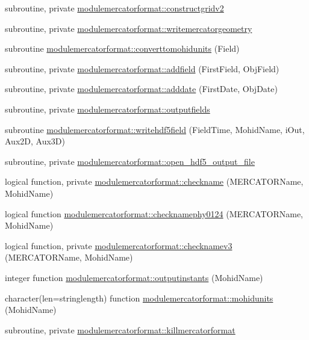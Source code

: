 \begin{DoxyCompactItemize}
subroutine, private \mbox{\hyperlink{namespacemodulemercatorformat_ab1d75b183b32a1b3d634bf12fcf66303}{modulemercatorformat\+::constructgridv2}}
\item 
subroutine, private \mbox{\hyperlink{namespacemodulemercatorformat_a91963802a12780a4b2d6d09497ba91ac}{modulemercatorformat\+::writemercatorgeometry}}
\item 
subroutine \mbox{\hyperlink{namespacemodulemercatorformat_afe587bb63f0975739ea6aae4c3ce6a6f}{modulemercatorformat\+::converttomohidunits}} (Field)
\item 
subroutine, private \mbox{\hyperlink{namespacemodulemercatorformat_ad07eac9a69191b73461fe88c7b6540d1}{modulemercatorformat\+::addfield}} (First\+Field, Obj\+Field)
\item 
subroutine, private \mbox{\hyperlink{namespacemodulemercatorformat_af022169c1f02b5fca22275beb30ca516}{modulemercatorformat\+::adddate}} (First\+Date, Obj\+Date)
\item 
subroutine, private \mbox{\hyperlink{namespacemodulemercatorformat_a9ef4ded8a79fc7dae92a2f3410aa9ab4}{modulemercatorformat\+::outputfields}}
\item 
subroutine \mbox{\hyperlink{namespacemodulemercatorformat_a0b4f8793ec9ff2e27a2372febde0eac4}{modulemercatorformat\+::writehdf5field}} (Field\+Time, Mohid\+Name, i\+Out, Aux2D, Aux3D)
\item 
subroutine, private \mbox{\hyperlink{namespacemodulemercatorformat_a856b781d5405606ffbd1e7409a516633}{modulemercatorformat\+::open\+\_\+hdf5\+\_\+output\+\_\+file}}
\item 
logical function, private \mbox{\hyperlink{namespacemodulemercatorformat_a824858a27df60fc6f255443ee4ca7a96}{modulemercatorformat\+::checkname}} (M\+E\+R\+C\+A\+T\+O\+R\+Name, Mohid\+Name)
\item 
logical function \mbox{\hyperlink{namespacemodulemercatorformat_a56d6a124d89d9acc9f4d378fbf3fc84f}{modulemercatorformat\+::checknamephy0124}} (M\+E\+R\+C\+A\+T\+O\+R\+Name, Mohid\+Name)
\item 
logical function, private \mbox{\hyperlink{namespacemodulemercatorformat_aa50cf57bf22a01dde1d85b4dd1d6baa0}{modulemercatorformat\+::checknamev3}} (M\+E\+R\+C\+A\+T\+O\+R\+Name, Mohid\+Name)
\item 
integer function \mbox{\hyperlink{namespacemodulemercatorformat_ab6a85f957c668b2ecb52cea10902d0e7}{modulemercatorformat\+::outputinstants}} (Mohid\+Name)
\item 
character(len=stringlength) function \mbox{\hyperlink{namespacemodulemercatorformat_afcc318c8448502d22aecff9e1bf75f91}{modulemercatorformat\+::mohidunits}} (Mohid\+Name)
\item 
subroutine, private \mbox{\hyperlink{namespacemodulemercatorformat_a33fe8f1a366fc933cb9debc1dcc3debe}{modulemercatorformat\+::killmercatorformat}}
\end{DoxyCompactItemize}
